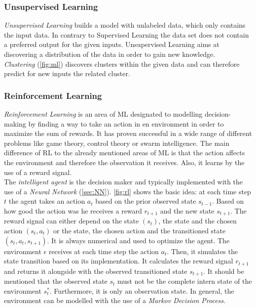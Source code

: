 \subsubsection{Unsupervised Learning}
\emph{Unsupervised Learning} builds a model with unlabeled data, which only contains the input data. 
In contrary to Supervised Learning the data set does not contain a preferred output for the given inputs. 
Unsupervised Learning aims at discovering a distribution of the data in order to gain new knowledge.\\
\emph{Clustering} (\cref{fig:ml}) discovers clusters within the given data and can therefore predict for new inputs the related cluster.

\subsubsection{Reinforcement Learning}
\emph{Reinforcement Learning} is an area of ML designated to modelling decision-making by finding a way to take an action in en environment in order to maximize the sum of rewards. 
It has proven successful in a wide range of different problems like game theory, control theory or swarm intelligence. 
The main difference of RL to the already mentioned areas of ML is that the action affects the environment and therefore the observation it receives. 
Also, it learns by the use of a reward signal.\\
The \emph{intelligent agent} is the decision maker and typically implemented with the use of a \emph{Neural Network} (\cref{sec:NN}). 
\cref{fig:rl} shows the basic idea: at each time step $t$ the agent takes an action $a_t$ based on the prior observed state $s_{t-1}$. 
Based on how good the action was he receives a reward $r_{t+1}$ and the new state $s_{t+1}$.
The reward signal can either depend on the state $(s_t)$, the state and the chosen action $(s_t, a_t)$ or the state, 
the chosen action and the transitioned state $(s_t, a_t, s_{t+1})$. It is always numerical and used to optimize the agent.
The environment $\epsilon$ receives at each time step the action $a_t$. 
Then, it simulates the state transition based on its implementation. 
It calculates the reward signal $r_{t+1}$ and returns it alongside with the observed transitioned state $s_{t+1}$. 
It should be mentioned that the observed state $s_t$ must not be the complete intern state of the environment $s_t^*$. 
Furthermore, it is only an observation state.  
In general, the environment can be modelled with the use of a \emph{Markov Decision Process}.

